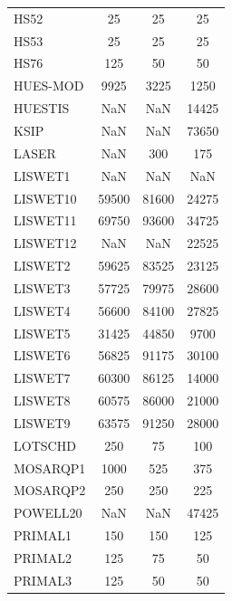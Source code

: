 \begin{longtable}{lccc}
HS52     &            25 &            25 &            25 \\
HS53     &            25 &            25 &            25 \\
HS76     &           125 &            50 &            50 \\
HUES-MOD &          9925 &          3225 &          1250 \\
HUESTIS  &           NaN &           NaN &         14425 \\
KSIP     &           NaN &           NaN &         73650 \\
LASER    &           NaN &           300 &           175 \\
LISWET1  &           NaN &           NaN &           NaN \\
LISWET10 &         59500 &         81600 &         24275 \\
LISWET11 &         69750 &         93600 &         34725 \\
LISWET12 &           NaN &           NaN &         22525 \\
LISWET2  &         59625 &         83525 &         23125 \\
LISWET3  &         57725 &         79975 &         28600 \\
LISWET4  &         56600 &         84100 &         27825 \\
LISWET5  &         31425 &         44850 &          9700 \\
LISWET6  &         56825 &         91175 &         30100 \\
LISWET7  &         60300 &         86125 &         14000 \\
LISWET8  &         60575 &         86000 &         21000 \\
LISWET9  &         63575 &         91250 &         28000 \\
LOTSCHD  &           250 &            75 &           100 \\
MOSARQP1 &          1000 &           525 &           375 \\
MOSARQP2 &           250 &           250 &           225 \\
POWELL20 &           NaN &           NaN &         47425 \\
PRIMAL1  &           150 &           150 &           125 \\
PRIMAL2  &           125 &            75 &            50 \\
PRIMAL3  &           125 &            50 &            50 \\

\end{longtable}

